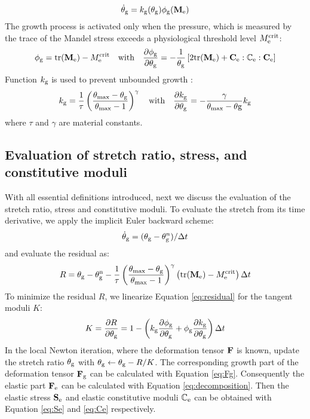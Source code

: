 \begin{equation} \label{eq:stretchRatio}
\dot\theta_{\mathrm{g}} = k_{\mathrm{g}}(\theta_{\mathrm{g}})\phi_{\mathrm{g}}(\bold{M}_{\mathrm{e}})
\end{equation}
The growth process is activated only when the pressure, which is measured by the trace of the Mandel stress exceeds a physiological threshold level $M_{\mathrm{e}}^{\mathrm{crit}}$:
\begin{equation} \label{eq:stretchRatio2}
\phi_{\mathrm{g}} = \mathrm{tr}(\bold{M}_{\mathrm{e}}) - M_{\mathrm{e}}^{\mathrm{crit}} \quad \mathrm{with} \quad \frac{\partial \phi_{\mathrm{g}}}{\partial \theta_{\mathrm{g}}} = -\frac{1}{\theta_{\mathrm{g}}} \left[2\mathrm{tr}(\bold{M}_{\mathrm{e}}) + \bold{C}_{\mathrm{e}} : \mathbb{C}_{\mathrm{e}} : \bold{C}_{\mathrm{e}}\right]
\end{equation}
Function $k_{\mathrm{g}}$ is used to prevent unbounded growth \cite{Lubarda2}:
\begin{equation} \label{eq:stretchRatio3}
k_{\mathrm{g}} = \frac{1}{\tau}\left( \frac{\theta_\mathrm{max} - \theta_{\mathrm{g}}}{\theta_\mathrm{max} - 1} \right)^\gamma
\quad \mathrm{with} \quad 
\frac{\partial k_{\mathrm{g}}}{\partial \theta_{\mathrm{g}}} = -\frac{\gamma}{\theta_\mathrm{max} - \theta\mathrm{g}}k_{\mathrm{g}}
\end{equation}
where $\tau$ and $\gamma$ are material constants.

\subsection{Evaluation of stretch ratio, stress, and constitutive moduli}
With all essential definitions introduced, next we discuss the evaluation of the stretch ratio, stress and constitutive moduli. To evaluate the stretch from its time derivative, we apply the implicit Euler backward scheme:
\begin{equation} \label{eq:Euler}
\dot\theta_{\mathrm{g}} = (\theta_{\mathrm{g}} - \theta_{\mathrm{g}}^n)/\Delta t
\end{equation}
and evaluate the residual as:
\begin{equation} \label{eq:residual}
R = \theta_{\mathrm{g}} - \theta_{\mathrm{g}}^\mathrm{n} - \frac{1}{\tau}\left( \frac{\theta_\mathrm{max} - \theta_{\mathrm{g}}}{\theta_\mathrm{max} - 1} \right)^\gamma\left(\mathrm{tr}(\bold{M}_{\mathrm{e}}) - M_{\mathrm{e}}^{\mathrm{crit}}\right)\Delta t
\end{equation}
To minimize the residual $R$, we linearize Equation \ref{eq:residual} for the tangent moduli $K$:
\begin{equation} \label{eq:K}
K = \frac{\partial R}{\partial \theta_{\mathrm{g}}} =  1 - \left( k_{\mathrm{g}} \frac{\partial \phi_{\mathrm{g}}}{\partial \theta_{\mathrm{g}}} + \phi_{\mathrm{g}} \frac{\partial k_{\mathrm{g}}}{\partial \theta_{\mathrm{g}}} \right)\Delta t
\end{equation}
In the local Newton iteration, where the deformation tensor $\bold{F}$ is known, update the stretch ratio $\theta_{\mathrm{g}}$ with $\theta_{\mathrm{g}} \leftarrow \theta_{\mathrm{g}} - R/K$. The corresponding growth part of the deformation tensor $\bold{F}_{\mathrm{g}}$ can be calculated with Equation \ref{eq:Fg}. Consequently the elastic part $\bold{F}_{\mathrm{e}}$ can be calculated with Equation \ref{eq:decomposition}. Then the elastic stress $\bold{S}_{\mathrm{e}}$ and elastic constitutive moduli $\mathbb{C}_{\mathrm{e}}$ can be obtained with Equation \ref{eq:Se} and \ref{eq:Ce} respectively.

